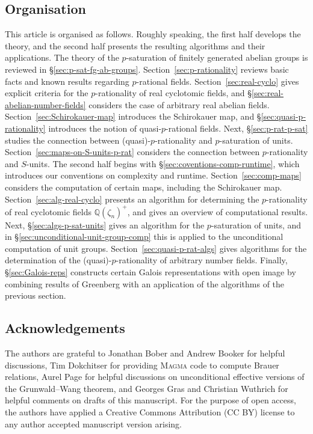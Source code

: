 \documentclass[12pt, a4paper, usenames]{amsart}
\newcommand{\Q}{\mathbb{Q}}
\theoremstyle{plain}
\theoremstyle{remark}
\theoremstyle{definition}
\begin{document}
\subsection*{Organisation}
This article is organised as follows. 
Roughly speaking, the first half develops the theory, and the second half 
presents the resulting algorithms and their applications.
The theory of the $p$-saturation of finitely generated abelian groups is reviewed
in \S \ref{sec:p-sat-fg-ab-groups}.
Section~\ref{sec:p-rationality} reviews basic facts and known results regarding 
$p$-rational fields. 
Section~\ref{sec:real-cyclo} gives explicit criteria for the $p$-rationality
of real cyclotomic fields, and \S \ref{sec:real-abelian-number-fields}
considers the case of arbitrary real abelian fields.
Section~\ref{sec:Schirokauer-map} introduces the Schirokauer map,
and \S \ref{sec:quasi-p-rationality} introduces the notion of
quasi-$p$-rational fields. 
Next, \S \ref{sec:p-rat-p-sat} studies the connection between (quasi)-$p$-rationality
and $p$-saturation of units. Section~\ref{sec:maps-on-S-units-p-rat} considers
the connection between $p$-rationality and $S$-units.
The second half begins with \S \ref{sec:coventions-comp-runtime}, which 
introduces our conventions on complexity and runtime. 
Section~\ref{sec:comp-maps} considers the computation of certain maps, 
including the Schirokauer map. 
Section~\ref{sec:alg-real-cyclo} presents an algorithm for determining the
$p$-rationality of real cyclotomic fields $\Q(\zeta_{n})^{+}$, and gives an 
overview of computational results.
Next, \S \ref{sec:algs-p-sat-units} gives an algorithm for the $p$-saturation of units, and in \S \ref{sec:unconditional-unit-group-comp} this is applied 
to the unconditional computation of unit groups.
Section~\ref{sec:quasi-p-rat-algs} gives algorithms 
for the determination of the (quasi)-$p$-rationality of arbitrary number fields. 
Finally, \S \ref{sec:Galois-reps} constructs certain Galois representations with open image by combining results of Greenberg with an application of the algorithms
of the previous section.

\subsection*{Acknowledgements}
The authors are grateful to Jonathan Bober and Andrew Booker for helpful discussions,
Tim Dokchitser for providing \textsc{Magma} \cite{MR1484478} code to compute Brauer relations, 
Aurel Page for helpful discussions on unconditional effective versions of the
Grunwald--Wang theorem, and Georges Gras and Christian Wuthrich for helpful comments on drafts of this manuscript.
For the purpose of open access, the authors have applied a Creative Commons Attribution (CC BY) license to any author accepted manuscript version arising.
\end{document}
